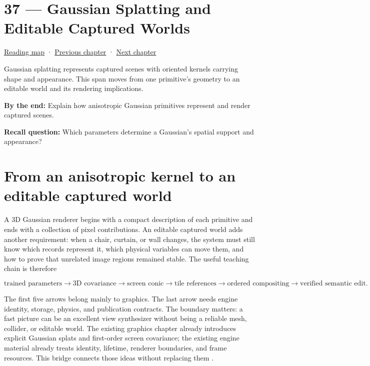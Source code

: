\hypertarget{04-visual-computing-ii-ch037}{}
\chapter{37 --- Gaussian Splatting and Editable Captured Worlds}\label{04-visual-computing-ii-ch037-gaussian-splatting-and-editable-captured-worlds}

\hyperref[volume-reading-map]{Reading map} · \hyperref[04-visual-computing-ii-ch036-source-atlas-and-reconstruction-checkpoints]{Previous chapter} · \hyperref[04-visual-computing-ii-ch038-projecting-ellipsoids-into-screen-space-conics]{Next chapter}

Gaussian splatting represents captured scenes with oriented kernels carrying shape and appearance. This span moves from one primitive's geometry to an editable world and its rendering implications.

\textbf{By the end:} Explain how anisotropic Gaussian primitives represent and render captured scenes.

\textbf{Recall question:} Which parameters determine a Gaussian's spatial support and appearance?

\chapter{From an anisotropic kernel to an editable captured world}\label{04-visual-computing-ii-ch037-from-an-anisotropic-kernel-to-an-editable-captured-world}

A 3D Gaussian renderer begins with a compact description of each primitive and ends with a collection of pixel contributions. An editable captured world adds another requirement: when a chair, curtain, or wall changes, the system must still know which records represent it, which physical variables can move them, and how to prove that unrelated image regions remained stable. The useful teaching chain is therefore

\[
\text{trained parameters}
\to \text{3D covariance}
\to \text{screen conic}
\to \text{tile references}
\to \text{ordered compositing}
\to \text{verified semantic edit}.
\]

The first five arrows belong mainly to graphics. The last arrow needs engine identity, storage, physics, and publication contracts. The boundary matters: a fast picture can be an excellent view synthesizer without being a reliable mesh, collider, or editable world. The existing graphics chapter already introduces explicit Gaussian splats and first-order screen covariance; the existing engine material already treats identity, lifetime, renderer boundaries, and frame resources. This bridge connects those ideas without replacing them .

